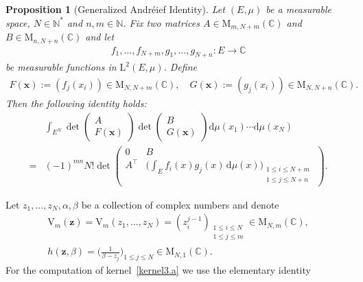 \documentclass[pdflatex,sn-mathphys-num]{sn-jnl}
\theoremstyle{thmstyleone}
\newtheorem{proposition}[theorem]{Proposition}
\numberwithin{equation}{section}
\newcommand{\C}{\mathbb{C}}
\begin{document}
\begin{appendices}
\begin{proposition}[Generalized Andr\'eief Identity]
Let $ \left(E,\mu \right) $ be a measurable space, $N\in\mathbb{N}^*$ and $n,m\in\mathbb{N}$. Fix two matrices $A\in \mathrm{M}_{m, N+m}(\C)$ and  $B\in \mathrm{M}_{n, N+n}(\C)$ and let 
\begin{align*}
    f_{1},\ldots,f_{N+m}, g_{1},\ldots,g_{N+n}:E\to\C
\end{align*}
be measurable functions in $\mathrm{L}^2(E,\mu)$. Define
\begin{align*}
    F\left(\mathbf{x}\right):=\left(f_{j}\left(x_{i}\right)\right)\in\mathrm{M}_{N, N+m}(\C),\quad G\left(\mathbf{x}\right):=\left(g_{j}\left(x_{i}\right)\right)\in\mathrm{M}_{N, N+n}(\C).
\end{align*}
Then the following identity holds:
\begin{align}\label{th:andreiev}
    &\int_{E^{N}} \det\begin{pmatrix}
    A \\ F\left(\mathbf{x}\right)
    \end{pmatrix}
    \det\begin{pmatrix}
    B \\ G\left(\mathbf{x}\right)
    \end{pmatrix}
\mathrm{d}\mu\left(x_{1}\right)\cdots\mathrm{d}\mu\left(x_{N}\right)\nonumber
\\
=& \left(-1\right)^{mn} N!
 \det\left(\begin{array}{c|c}
0 & B \\ \hline
A^{\top} & \Big( \int_{E} f_{i}\left(x\right)g_{j}\left(x\right) \, \mathrm{d}\mu(x) \Big)_{\substack{1\leq i\leq N+m\\1\leq j\leq N+n}}
\end{array}\right).
\end{align}
\end{proposition}
Let $z_{1},\ldots,z_{N},\alpha,\beta$ be a collection of complex numbers and denote
\begin{align}
    \mathrm{V}_{m}\left( \textbf{z} \right)=\mathrm{V}_{m}\left( z_{1},\ldots,z_{N} \right)=\left( z^{j-1}_{i} \right)_{\substack{1\leq i\leq N\\1\leq j\leq m}}\in\mathrm{M}_{N,m}\left(\C\right),
    \\
    h\left(\textbf{z},\beta\right)=\Bigg(\frac{1}{\beta-z_{j}}\Bigg)_{1\leq j\leq N}\in\mathrm{M}_{N,1}\left(\C\right).
\end{align}
For the computation of kernel~\eqref{kernel3.a} we use the elementary identity

\end{appendices}
\end{document}
